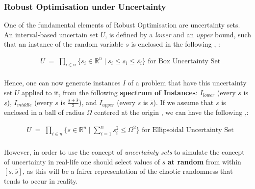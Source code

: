 
\subsubsection*{Robust Optimisation under Uncertainty}
One of the fundamental elements of Robust Optimisation are uncertainty sets. An interval-based uncertain set $U$, is defined by a \textit{lower} and an \textit{upper} bound, such that an instance of the random variable $s$ is enclosed in the following \cite{Bertsimas2011TheoryAA}, \cite{robustuncertainty}:

\vspace{\baselineskip}
\begin{equation}
\begin{aligned}
& U \; = \; \prod_{i\in n} \{s_i \in \mathbb{R}^{n} \; | \; \underline{s_i} \leq s_i \leq  \overline{s_i}\} \text{    for Box Uncertainty Set} \\
\end{aligned}
\end{equation}

\vspace{\baselineskip}
\noindent
Hence, one can now generate instances $I$ of a problem that have this uncertainty set $U$ applied to it, from the following \textbf{spectrum of Instances}: $I_{lower}$ (every $s$ is $\underline{s}$), $I_{middle}$ (every $s$ is $\frac{\underline{s}+\overline{s}}{2}$), and $I_{upper}$ (every $s$ is $\overline{s}$). If we assume that $s$ is enclosed in a ball of radius $\Omega$ centered at the origin \cite{robustoptimisation}, we can have the following \cite{christodoulos},\cite{GORISSEN}:

\vspace{\baselineskip}
\begin{equation}
\begin{aligned}
& U \; = \; \prod_{i\in n} \{s \in \mathbb{R}^{n} \; | \; \sum _{i=1}^{n}s_{i}^2  \leq  \Omega^2 \} \text{    for Ellipsoidal Uncertainty Set} \\
\end{aligned}
\end{equation}

\vspace{\baselineskip}
\noindent
However, in order to use the concept of \textit{uncertainty sets} to simulate the concept of uncertainty in real-life one should select values of $s$ \textbf{at random} from within $[\underline{s},\overline{s}]$, as this will be a fairer representation of the chaotic randomness that tends to occur in reality.

